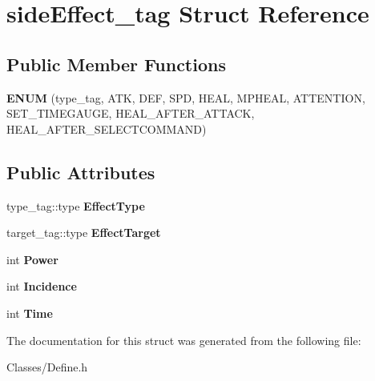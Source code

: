 \hypertarget{structside_effect__tag}{}\section{side\+Effect\+\_\+tag Struct Reference}
\label{structside_effect__tag}
\subsection*{Public Member Functions}
\begin{DoxyCompactItemize}
\item 
{\bfseries E\+N\+UM} (type\+\_\+tag, A\+TK, D\+EF, S\+PD, H\+E\+AL, M\+P\+H\+E\+AL, A\+T\+T\+E\+N\+T\+I\+ON, S\+E\+T\+\_\+\+T\+I\+M\+E\+G\+A\+U\+GE, H\+E\+A\+L\+\_\+\+A\+F\+T\+E\+R\+\_\+\+A\+T\+T\+A\+CK, H\+E\+A\+L\+\_\+\+A\+F\+T\+E\+R\+\_\+\+S\+E\+L\+E\+C\+T\+C\+O\+M\+M\+A\+ND)\hypertarget{structside_effect__tag_ab82e228f131bb664c7478d25e11c8b31}{}\label{structside_effect__tag_ab82e228f131bb664c7478d25e11c8b31}

\end{DoxyCompactItemize}
\subsection*{Public Attributes}
\begin{DoxyCompactItemize}
\item 
type\+\_\+tag\+::type {\bfseries Effect\+Type}\hypertarget{structside_effect__tag_af4647ccd1d4b3556cff1a6ffb886a15d}{}\label{structside_effect__tag_af4647ccd1d4b3556cff1a6ffb886a15d}

\item 
target\+\_\+tag\+::type {\bfseries Effect\+Target}\hypertarget{structside_effect__tag_a7b2b8eaa0df7c695295bcf235a8b7299}{}\label{structside_effect__tag_a7b2b8eaa0df7c695295bcf235a8b7299}

\item 
int {\bfseries Power}\hypertarget{structside_effect__tag_a6b30d47d6310a64e26017b1ecba11a39}{}\label{structside_effect__tag_a6b30d47d6310a64e26017b1ecba11a39}

\item 
int {\bfseries Incidence}\hypertarget{structside_effect__tag_a7f184e69f6f5638a8fdca52ddf7335de}{}\label{structside_effect__tag_a7f184e69f6f5638a8fdca52ddf7335de}

\item 
int {\bfseries Time}\hypertarget{structside_effect__tag_ad99ad9b24a1bac25882bcf7bf6fa648a}{}\label{structside_effect__tag_ad99ad9b24a1bac25882bcf7bf6fa648a}

\end{DoxyCompactItemize}


The documentation for this struct was generated from the following file\+:\begin{DoxyCompactItemize}
\item 
Classes/Define.\+h\end{DoxyCompactItemize}
